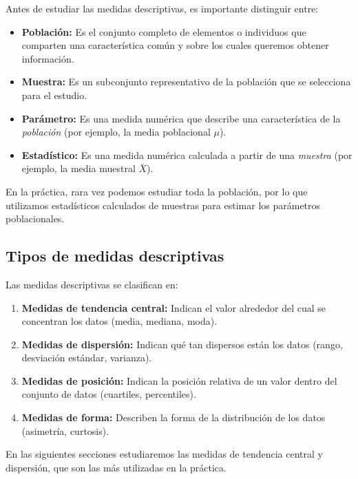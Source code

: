 Antes de estudiar las medidas descriptivas, es importante distinguir entre:

\begin{definicion}
	\begin{itemize}
		\item \textbf{Población:} Es el conjunto completo de elementos o individuos que comparten una característica común y sobre los cuales queremos obtener información.
		\item \textbf{Muestra:} Es un subconjunto representativo de la población que se selecciona para el estudio.
	\end{itemize}
\end{definicion}

\begin{definicion}
	\begin{itemize}
		\item \textbf{Parámetro:} Es una medida numérica que describe una característica de la \emph{población} (por ejemplo, la media poblacional $\mu$).
		\item \textbf{Estadístico:} Es una medida numérica calculada a partir de una \emph{muestra} (por ejemplo, la media muestral $\bar{X}$).
	\end{itemize}
\end{definicion}

\begin{observacion}
	En la práctica, rara vez podemos estudiar toda la población, por lo que utilizamos estadísticos calculados de muestras para estimar los parámetros poblacionales.
\end{observacion}

\subsection{Tipos de medidas descriptivas}

Las medidas descriptivas se clasifican en:

\begin{enumerate}
	\item \textbf{Medidas de tendencia central:} Indican el valor alrededor del cual se concentran los datos (media, mediana, moda).
	\item \textbf{Medidas de dispersión:} Indican qué tan dispersos están los datos (rango, desviación estándar, varianza).
	\item \textbf{Medidas de posición:} Indican la posición relativa de un valor dentro del conjunto de datos (cuartiles, percentiles).
	\item \textbf{Medidas de forma:} Describen la forma de la distribución de los datos (asimetría, curtosis).
\end{enumerate}

En las siguientes secciones estudiaremos las medidas de tendencia central y dispersión, que son las más utilizadas en la práctica.
